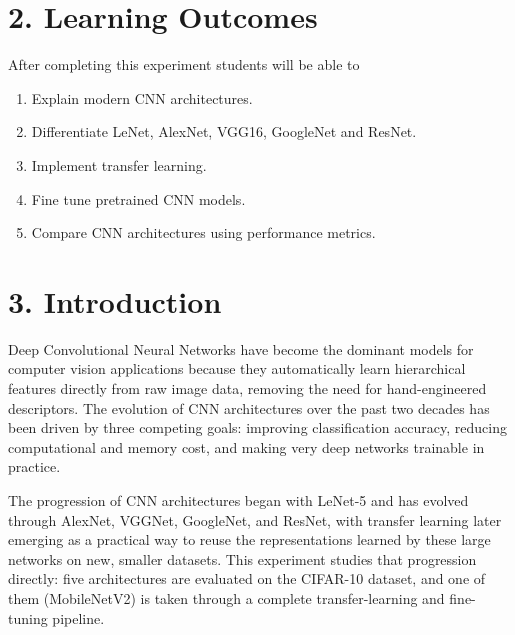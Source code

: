 \documentclass[11pt]{article}
\begin{document}

\section*{2. Learning Outcomes}

After completing this experiment students will be able to

\begin{enumerate}

\item Explain modern CNN architectures.

\item Differentiate LeNet, AlexNet, VGG16, GoogleNet and ResNet.

\item Implement transfer learning.

\item Fine tune pretrained CNN models.

\item Compare CNN architectures using performance metrics.

\end{enumerate}


\section*{3. Introduction}

Deep Convolutional Neural Networks have become the dominant models for
computer vision applications because they automatically learn hierarchical
features directly from raw image data, removing the need for hand-engineered
descriptors. The evolution of CNN architectures over the past two decades has
been driven by three competing goals: improving classification accuracy,
reducing computational and memory cost, and making very deep networks
trainable in practice.

The progression of CNN architectures began with LeNet-5 and has evolved
through AlexNet, VGGNet, GoogleNet, and ResNet, with transfer learning later
emerging as a practical way to reuse the representations learned by these
large networks on new, smaller datasets. This experiment studies that
progression directly: five architectures are evaluated on the CIFAR-10
dataset, and one of them (MobileNetV2) is taken through a complete
transfer-learning and fine-tuning pipeline.
\end{document}
